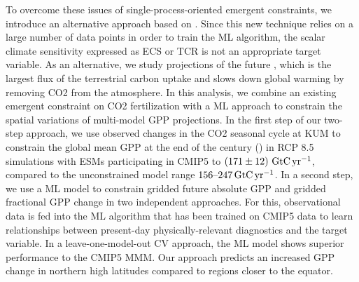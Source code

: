 To overcome these issues of single-process-oriented emergent constraints, we
introduce an alternative approach based on . Since this new
technique relies on a large number of data points in order to train the
\acs{ML} algorithm, the scalar climate sensitivity expressed as \acs{ECS} or
\acs{TCR} is not an appropriate target variable. As an alternative, we study
projections of the future , which is the largest flux of the
terrestrial carbon uptake and slows down global warming by removing \acs{CO2}
from the atmosphere. In this analysis, we combine an existing emergent
constraint on \acs{CO2} fertilization with a \acs{ML} approach to constrain the
spatial variations of multi-model \acs{GPP} projections. In the first step of
our two-step approach, we use observed changes in the \acs{CO2} seasonal cycle
at \acl{KUM} to constrain the global mean \acs{GPP} at the end of the 
century () in \acl{RCP} 8.5 simulations with \acsp{ESM}
participating in \acs{CMIP}5 to $\pmrangeunit{171}{12}{\GtCyr{}}$, compared to
the unconstrained model range $\rangeunit{156}{247}{\GtCyr{}}$. In a second
step, we use a \acs{ML} model to constrain gridded future absolute \acs{GPP}
and gridded fractional \acs{GPP} change in two independent approaches. For
this, observational data is fed into the \acs{ML} algorithm that has been
trained on \acs{CMIP}5 data to learn relationships between present-day
physically-relevant diagnostics and the target variable. In a
leave-one-model-out \acl{CV} approach, the \acs{ML} model shows superior
performance to the \acs{CMIP}5 \acs{MMM}. Our approach predicts an increased
\acs{GPP} change in northern high latitudes compared to regions closer to the
equator.
